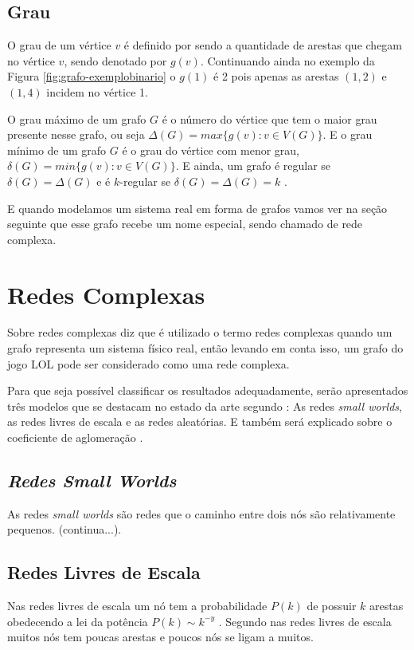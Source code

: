 \subsection{Grau}

O grau de um vértice \(v\) é definido por \citet{grafosucinto} sendo a quantidade de arestas que chegam no vértice \(v\), sendo denotado por \(g(v)\). Continuando ainda no exemplo da Figura \ref{fig:grafo-exemplobinario} o \(g(1)\) é 2 pois apenas as arestas \((1,2)\) e \((1,4)\) incidem no vértice 1.

O grau máximo de um grafo \(G\) é o número do vértice que tem o maior grau presente nesse grafo, ou seja \(\Delta(G) = max\{g(v) : v \in V(G)\}\). E o grau mínimo de um grafo \(G\) é o grau do vértice com menor grau, \(\delta(G) = min\{g(v) : v \in V(G)\}\). E ainda, um grafo é regular se \(\delta(G) = \Delta(G)\) e é \(k\)-regular se \(\delta(G) = \Delta(G) = k\) \cite{grafosucinto}.


E quando modelamos um sistema real em forma de grafos vamos ver na seção seguinte que esse grafo recebe um nome especial, sendo chamado de rede complexa.

\section{Redes Complexas}
\label{chap:redecomplexa}
Sobre redes complexas \citet{Viana2007} diz que é utilizado o termo redes complexas quando um grafo representa um sistema físico real, então levando em conta isso, um grafo do jogo LOL pode ser considerado como uma rede complexa.

Para que seja possível classificar os resultados adequadamente, serão apresentados três modelos que se destacam no estado da arte segundo \citet{Albert2002}: As redes \textit{small worlds}, as redes livres de escala e as redes aleatórias. E também será explicado sobre o coeficiente de aglomeração .

\subsection{\textit{Redes Small Worlds}}
 As redes \textit{small worlds} são redes que o caminho entre dois nós são relativamente pequenos. (continua...).
 
 
 \subsection{Redes Livres de Escala}
 Nas redes livres de escala um nó tem a probabilidade \(P(k)\) de possuir \(k\) arestas obedecendo a lei da potência \(P(k) \sim k^{-y}\) \cite{Albert2002,Antiqueira2005}. Segundo \citet{Viana2007} nas redes livres de escala muitos nós tem poucas arestas e poucos nós se ligam a muitos.
 
